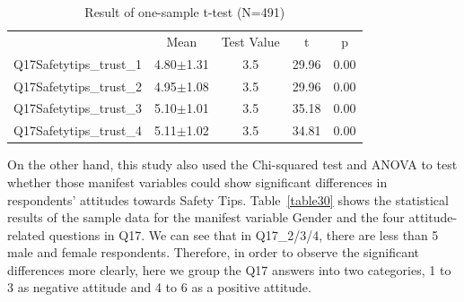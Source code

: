 \begin{table}[h]
  \caption[Result of one-sample t-test]{Result of one-sample t-test (N=491)}
  \label{table29}
  \centering
  \begin{tabular}{l|cccc}
 \hline
                  & Mean                 & Test Value & t                          & p                        \\
Q17Safetytips\_trust\_1 & 4.80$\pm$1.31            & 3.5                            & 29.96 & 0.00 \\
Q17Safetytips\_trust\_2 & 4.95$\pm$1.08            & 3.5                            & 29.96 & 0.00 \\
Q17Safetytips\_trust\_3 & 5.10$\pm$1.01            & 3.5                            & 35.18 & 0.00 \\
Q17Safetytips\_trust\_4 & 5.11$\pm$1.02            & 3.5                            & 34.81 & 0.00 \\
 \hline
  \end{tabular}
\end{table}

On the other hand, this study also used the Chi-squared test and ANOVA to test whether those manifest variables could show significant differences in respondents' attitudes towards Safety Tips. Table~\ref{table30} shows the statistical results of the sample data for the manifest variable Gender and the four attitude-related questions in Q17. We can see that in Q17\_2/3/4, there are less than 5 male and female respondents. Therefore, in order to observe the significant differences more clearly, here we group the Q17 answers into two categories, 1 to 3 as negative attitude and 4 to 6 as a positive attitude.


